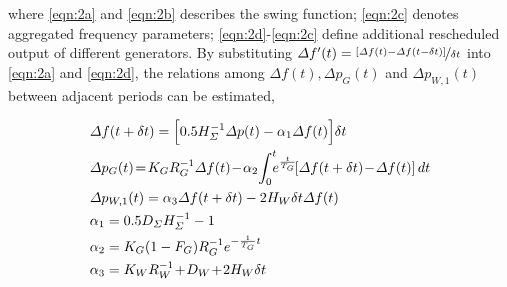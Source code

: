 \documentclass[lettersize,journal]{IEEEtran}
\begin{document}

\noindent where \eqref{eqn:2a} and \eqref{eqn:2b} describes the swing function; \eqref{eqn:2c} denotes aggregated frequency parameters; \eqref{eqn:2d}-\eqref{eqn:2c} define additional rescheduled output of different generators.  By substituting $\varDelta f^{\prime}(t) = \nicefrac{[\varDelta f(t)-\varDelta f(t-\delta t)]}{ \delta t}$ into \eqref{eqn:2a} and \eqref{eqn:2d}, the relations among $\varDelta f(t), \varDelta p_{G}(t)$ and $\varDelta p_{W,1}(t)$ between adjacent periods can be estimated,

\vspace{-0.125in}
\begin{newsubequations}\label{eqn:3}
	\begin{align}
		 & \varDelta f(t+\delta t) = \Bigl [ 0.5{H_{\varSigma}^{-1}}\varDelta p(t)  - \alpha_1\varDelta f(t) \Bigr ] \delta t   \label{eqn:3a}   \\
		 & \varDelta p_{G}(t)\!=\!{K_{G} }{ R_{G}^{-1}} \varDelta f(t) \!-\! \alpha_2 \!\int_{0}^{t} \!\!\! e^{\frac{t}{T_G}} \!\!\left[\varDelta f(t+\delta t) \!-\! \varDelta f(t) \right] dt  \label{eqn:3b} \\
		 & \varDelta p_{W,1}(t) = \alpha_3 \varDelta f(t + \delta t) - 2H_{W} \delta t \varDelta f(t)  \label{eqn:3c}   \\
		 & \alpha_1 = 0.5{D_{\varSigma}}{H_{\varSigma}^{-1}}-1 \label{eqn:3d}  \\
		 & \alpha_2 = {K_G(1-F_G)}{ R_{G}^{-1} }e^{-\frac{1}{T_G} t} \label{eqn:3e}  \\
		 & \alpha_3 = {K_{W} } R_{W}^{-1} \!+\! D_{W} \!+\! 2H_{W} \delta t \label{eqn:3f}
	\end{align} \end{newsubequations}
\end{document}
